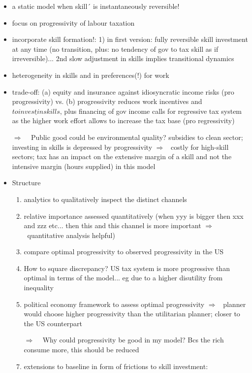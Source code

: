 \documentclass[12pt]{article}
\newcommand{\ar}{$\Rightarrow$ \ }
\begin{document}
\begin{itemize}
\item a static model when skill´ is instantaneously reversible! 
\item focus on progressivity of labour taxation
\item incorporate skill formation!: 1) in first version: fully reversible skill investment at any time (no transition, plus: no tendency of gov to tax skill as if irreversible)... 2nd slow adjustment in skills implies transitional dynamics
\item heterogeneity in skills and in preferences(!) for work
\item trade-off: (a) equity and insurance against idiosyncratic income risks (pro progressivity) vs. (b) progressivity reduces work incentives and $\underline{to invest in skills}$, plus financing of gov income calls for regressive tax system as the higher work effort allows to increase the tax base (pro regressivity)
\item[\ar] \textcolor{sonja}{Public good could be environmental quality? subsidies to clean sector; investing in skills is depressed by progressivity \ar costly for high-skill sectors; tax has an impact on the extensive margin of a skill and not the intensive margin (hours supplied) in this model }
\item Structure
\begin{enumerate}
\item analytics to qualitatively inspect the distinct channels
\item relative importance assessed quantitatively (when yyy is bigger then xxx and zzz etc... then this and this channel is more important \ar quantitative analysis helpful)
\item compare optimal progressivity to observed progressivity in the US
\item How to square discrepancy? US tax system is more progressive than optimal in terms of the model... eg due to a higher disutility from inequality
\item political economy framework to assess optimal progressivity \ar planner would choose higher progressivity than the utilitarian planner; closer to the US counterpart
\item[\ar] \textcolor{sonja}{Why could progressivity be good in my model? Bcs the rich consume more, this should be reduced}
\item extensions to baseline in form of frictions to skill investment: 
\begin{itemize}

\end{itemize}
\end{enumerate}
\end{itemize}
\end{document}
